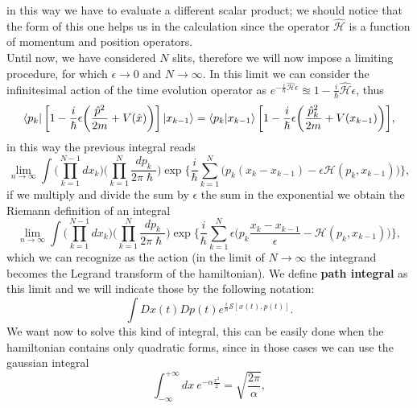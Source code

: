 in this way we have to evaluate a different scalar product; we should notice that the form of this one helps us in the calculation since the operator $\hat{\mathcal{H} }$ is a function of momentum and position operators.\\
Until now, we have considered $N$ slits, therefore we will now impose a limiting procedure, for which $\epsilon\rightarrow0$ and $N\rightarrow\infty$. In this limit we can consider the infinitesimal action of the time evolution operator as $e^{-\frac{i}{\hslash}\hat{\mathcal{H} }\epsilon}\approxeq1-\frac{i}{\hslash}\hat{\mathcal{H}}\epsilon$, thus
\begin{equation*}
    \bra{p_k}\bigg[1-\frac{i}{\hslash}\epsilon\bigg(\frac{\hat{p}^2}{2m}+V(\hat{x})\bigg)\bigg]\ket{x_{k-1}}=\braket{p_k|x_{k-1}}\bigg[1-\frac{i}{\hslash}\epsilon\bigg(\frac{\hat{p}_k^2}{2m}+V(x_{k-1})\bigg)\bigg],
\end{equation*}
in this way the previous integral reads
\begin{equation*}
    \lim_{n\rightarrow\infty}\int\bigg(\prod_{k=1}^{N-1}dx_k\bigg)\bigg(\prod_{k=1}^{N}\frac{dp_k}{2\pi\hslash}\bigg)\exp\bigg\{\frac{i}{\hslash}\sum_{k=1}^{N}\bigg(p_k(x_k-x_{k-1})-\epsilon\mathcal{H}(p_k,x_{k-1})\bigg) \bigg\},
\end{equation*}
if we multiply and divide the sum by $\epsilon$ the sum in the exponential we obtain the Riemann definition of an integral
\begin{equation*}
    \lim_{n\rightarrow\infty}\int\bigg(\prod_{k=1}^{N-1}dx_k\bigg)\bigg(\prod_{k=1}^{N}\frac{dp_k}{2\pi\hslash}\bigg)\exp\bigg\{\frac{i}{\hslash}\sum_{k=1}^{N}\epsilon\bigg(p_k\frac{x_k-x_{k-1}}{\epsilon}-\mathcal{H}(p_k,x_{k-1})\bigg) \bigg\},
\end{equation*}
which we can recognize as the action (in the limit of $N\rightarrow\infty$ the integrand becomes the Legrand transform of the hamiltonian). We define \textbf{path integral} as this limit and we will indicate those by the following notation:
\begin{equation*}
    \int Dx(t)Dp(t)e^{\frac{i}{\hslash}\mathcal{S} [x(t),p(t)]}.
\end{equation*} 
We want now to solve this kind of integral, this can be easily done when the hamiltonian contains only quadratic forms, since in those cases we can use the gaussian integral
\begin{equation*}
    \int_{-\infty}^{+\infty}dx\ e^{-\alpha\frac{x^2}{2}}=\sqrt{\frac{2\pi}{\alpha}},
\end{equation*}
